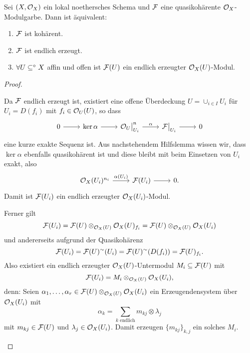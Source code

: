 \begin{satz}
    Sei $(X,\mathcal{O}_X)$ ein lokal noethersches Schema und $\mathcal{F}$ eine
    quasikohärente $\mathcal{O}_X$-Modulgarbe. Dann ist äquivalent:
    \begin{enumerate}[label=(\roman*)]
      \item $\mathcal{F}$ ist kohärent.
      \item $\mathcal{F}$ ist endlich erzeugt.
      \item $\forall U \subseteq^\circ X$ affin und offen ist
        $\mathcal{F}(U)$ ein endlich erzeugter $\mathcal{O}_X(U)$-Modul. 
    \end{enumerate}
\end{satz}
\begin{proof}
    \begin{description mathquote}
    \item[\text{(ii)}\Rightarrow\text{(iii)}]
        Da $\mathcal{F}$ endlich erzeugt ist, existiert eine offene Überdeckung
        $U = \cup_{i\in I} U_i$ für \obda $U_i = D(f_i)$ mit 
        $f_i \in \mathcal{O}_U(U)$, so dass
        \[\begin{tikzcd}[row sep=small]
            0 \rar & \ker\alpha \rar & 
            \O_U\rest{U_i}^n \rar{\alpha} & \F\rest{U_i} \rar & 0
        \end{tikzcd}\]
        eine kurze exakte Sequenz ist.
        Aus nachstehendem Hilfslemma wissen wir, dass $\ker\alpha$ ebenfalls
        quasikohärent ist und diese bleibt mit 
        beim Einsetzen von $U_i$ exakt, also
        \[\begin{tikzcd}[row sep=small] 
            \O_X(U_i)^{n_i} \rar{\alpha(U_i)} & \F(U_i) \rar & 0.
        \end{tikzcd}\]
        Damit ist $\mathcal{F}(U_i)$ ein endlich erzeugter $\mathcal{O}_X(U_i)$-Modul.
        
        Ferner gilt
        \[\mathcal{F}(U_i) = \mathcal{F}(U) \otimes_{\mathcal{O}_X(U)} \mathcal{O}_X(U)_{f_i} = 
            \mathcal{F}(U) \otimes_{\mathcal{O}_X(U)} \mathcal{O}_X(U_i)\]
        und andererseits aufgrund der Quasikohärenz
        \[\mathcal{F}(U_i) = \mathcal{F}(U)^\sim(U_i) = \mathcal{F}(U)^\sim(D(f_i)) = 
            \mathcal{F}(U)_{f_i}.\]
        Also existiert ein endlich erzeugter $\mathcal{O}_X(U)$-Untermodul
        $M_i \subseteq \mathcal{F}(U)$ mit
        \[\mathcal{F}(U_i) = M_i \otimes_{\mathcal{O}_X(U)} \mathcal{O}_X(U_i),\]
        denn: Seien 
        $\alpha_1, \ldots, \alpha_r \in \mathcal{F}(U)\otimes_{\mathcal{O}_X(U)}\mathcal{O}_X(U_i)$
        ein Erzeugendensystem über $\mathcal{O}_X(U_i)$ mit
        \[\alpha_k = \sum_{k \text{ endlich}} m_{kj} \otimes\lambda_j\]
        mit $m_{kj} \in \mathcal{F}(U)$ und $\lambda_j \in \mathcal{O}_X(U_i)$.
        Damit erzeugen $\{m_{kj}\}_{k,j}$ ein solches $M_i$.
        

\end{description mathquote}
\end{proof}
